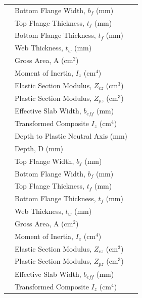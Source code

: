 \documentclass[12pt,a4paper]{report}
\numberwithin{table}{chapter}
\numberwithin{figure}{chapter}
\begin{document}
\begin{longtable}{|C{2.5cm}|L{8.0cm}|>{\centering\arraybackslash}p{5.0cm}|}
 & \textnormal{Bottom Flange Width, $b_f$ (mm)} &  \\[6pt]
 & \textnormal{Top Flange Thickness, $t_f$ (mm)} &  \\[6pt]
 & \textnormal{Bottom Flange Thickness, $t_f$ (mm)} &  \\[6pt]
 & \textnormal{Web Thickness, $t_w$ (mm)} &  \\[6pt]
 & \textnormal{Gross Area, A (cm$^2$)} &  \\[6pt]
 & \textnormal{Moment of Inertia, $I_z$ (cm$^4$)} &  \\[6pt]
 & \textnormal{Elastic Section Modulus, $Z_{ez}$ (cm$^3$)} &  \\[6pt]
 & \textnormal{Plastic Section Modulus, $Z_{pz}$ (cm$^3$)} &  \\[6pt]
 & \textnormal{Effective Slab Width, $b_{eff}$ (mm)} &  \\[6pt]
 & \textnormal{Transformed Composite $I_z$ (cm$^4$)} &  \\[6pt]
 & \textnormal{Depth to Plastic Neutral Axis (mm)} &  \\[6pt]
\hline
{} & \textnormal{Depth, D (mm)} &  \\[6pt]
 & \textnormal{Top Flange Width, $b_f$ (mm)} &  \\[6pt]
 & \textnormal{Bottom Flange Width, $b_f$ (mm)} &  \\[6pt]
 & \textnormal{Top Flange Thickness, $t_f$ (mm)} &  \\[6pt]
 & \textnormal{Bottom Flange Thickness, $t_f$ (mm)} &  \\[6pt]
 & \textnormal{Web Thickness, $t_w$ (mm)} &  \\[6pt]
 & \textnormal{Gross Area, A (cm$^2$)} &  \\[6pt]
 & \textnormal{Moment of Inertia, $I_z$ (cm$^4$)} &  \\[6pt]
 & \textnormal{Elastic Section Modulus, $Z_{ez}$ (cm$^3$)} &  \\[6pt]
 & \textnormal{Plastic Section Modulus, $Z_{pz}$ (cm$^3$)} &  \\[6pt]
 & \textnormal{Effective Slab Width, $b_{eff}$ (mm)} &  \\[6pt]
 & \textnormal{Transformed Composite $I_z$ (cm$^4$)} &  \\[6pt]

\end{longtable}
\end{document}
